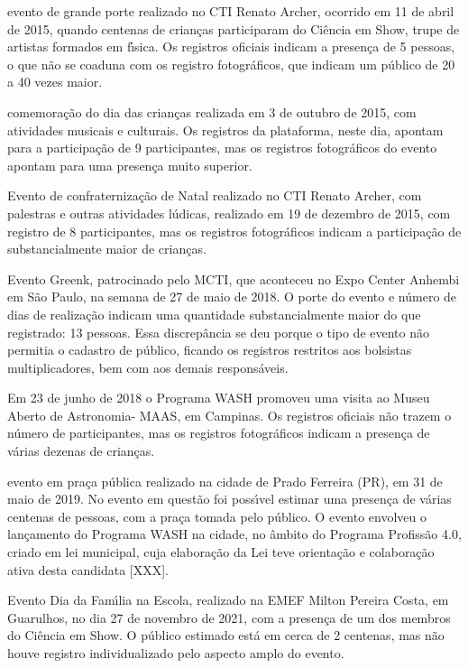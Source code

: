 \documentclass[
12pt,		%
openright,	%
twoside,  %
a4paper,			%
chapter=TITLE,		%
english,			%
french,				%
spanish,			%
brazil				%
]{USPSC-classe/USPSC}
\begin{document}
\begin{alineas}
\item evento de grande porte realizado no CTI Renato Archer, ocorrido em 11 de abril de 2015, quando centenas de crian\c{c}as participaram do Ci\^encia em Show, trupe de artistas formados em f\'{\i}sica. Os registros oficiais indicam a presen\c{c}a de 5 pessoas, o que n\~ao se coaduna com os registro fotogr\'aficos, que indicam um p\'ublico de 20 a 40 vezes maior.
\item comemora\c{c}\~ao do dia das crian\c{c}as realizada em 3 de outubro de 2015, com atividades musicais e culturais. Os registros da plataforma, neste dia, apontam para a participa\c{c}\~ao de 9 participantes, mas os registros fotogr\'aficos do evento apontam para uma presen\c{c}a muito superior.
\item Evento de confraterniza\c{c}\~ao de Natal realizado no CTI Renato Archer, com palestras e outras atividades l\'udicas, realizado em 19 de dezembro de 2015, com registro de 8 participantes, mas os registros fotogr\'aficos indicam a participa\c{c}\~ao de substancialmente maior de crian\c{c}as.
\item Evento Greenk, patrocinado pelo MCTI, que aconteceu no Expo Center Anhembi em S\~ao Paulo, na semana de 27 de maio de 2018. O porte do evento e n\'umero de dias de realiza\c{c}\~ao indicam uma quantidade substancialmente maior do que registrado: 13 pessoas. Essa discrep\^ancia se deu porque o tipo de evento n\~ao permitia o cadastro de p\'ublico, ficando os registros restritos aos bolsistas multiplicadores, bem com aos demais respons\'aveis.
\item Em 23 de junho de 2018 o Programa WASH promoveu uma visita ao Museu Aberto de Astronomia- MAAS, em Campinas. Os registros oficiais n\~ao trazem o n\'umero de participantes, mas os registros fotogr\'aficos indicam a presen\c{c}a de v\'arias dezenas de crian\c{c}as.
\item evento em pra\c{c}a p\'ublica realizado na cidade de Prado Ferreira (PR), em 31 de maio de 2019. No evento em quest\~ao foi poss\'{\i}vel estimar uma presen\c{c}a de v\'arias centenas de pessoas, com a pra\c{c}a tomada pelo p\'ublico. O evento envolveu o lan\c{c}amento do Programa WASH na cidade, no \^ambito do Programa Profiss\~ao 4.0, criado em lei municipal, cuja elabora\c{c}\~ao da Lei teve orienta\c{c}\~ao e colabora\c{c}\~ao ativa desta candidata [XXX].
\item Evento Dia da Fam\'{\i}lia na Escola, realizado na EMEF Milton Pereira Costa, em Guarulhos, no dia 27 de novembro de 2021, com a presen\c{c}a de um dos membros do Ci\^encia em Show. O p\'ublico estimado est\'a em cerca de 2 centenas, mas n\~ao houve registro individualizado pelo aspecto amplo do evento.
\end{alineas}
\end{document}

